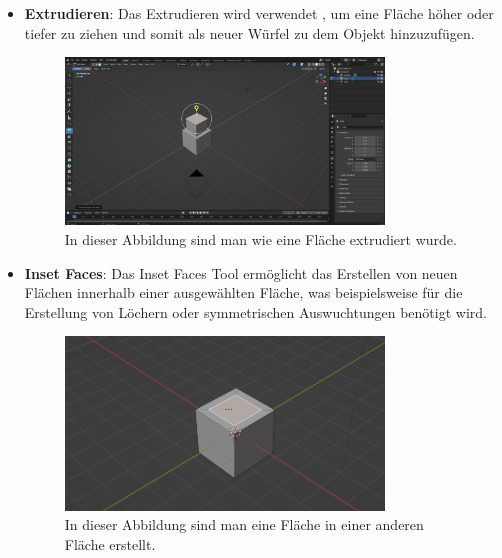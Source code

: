 \begin{itemize}
    \item \textbf{Extrudieren}:
    \indent Das Extrudieren wird verwendet , um eine Fläche höher oder tiefer zu ziehen und somit als neuer Würfel zu dem Objekt hinzuzufügen.
    \begin{figure}[H]
        \centering
        \includegraphics[width=0.8\textwidth]{chapters/13/images/ExtrudeTool.png}
        \caption{In dieser Abbildung sind man wie eine Fläche extrudiert wurde.}
        \label{UST-9}
    \end{figure}
    
    \item \textbf{Inset Faces}:
    \indent Das Inset Faces Tool ermöglicht das Erstellen von neuen Flächen innerhalb einer ausgewählten Fläche, was beispielsweise für die Erstellung von Löchern oder symmetrischen Auswuchtungen benötigt wird.
    \begin{figure}[H]
        \centering
        \includegraphics[width=0.8\textwidth]{chapters/13/images/InsetFace.png}
        \caption{In dieser Abbildung sind man eine Fläche in einer anderen Fläche erstellt.}
        \label{UST-10}
    \end{figure}
    

\end{itemize}
